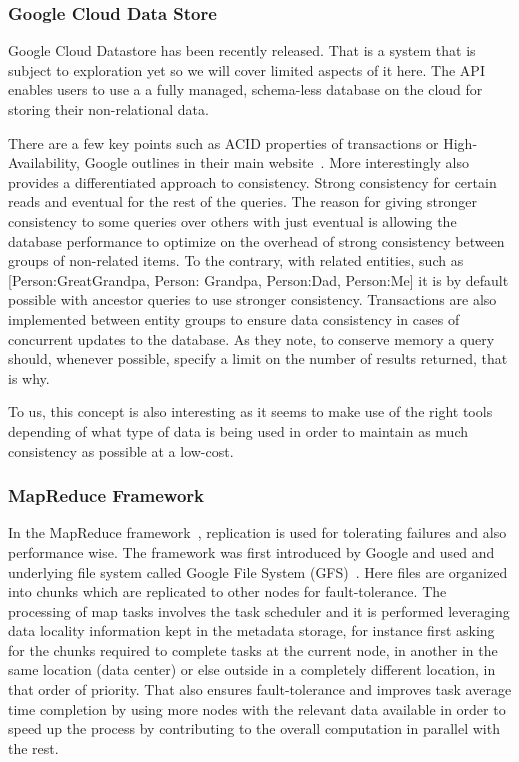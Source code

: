 \subsubsection{Google Cloud Data Store}
Google Cloud Datastore has been recently released. That is a system that is subject to exploration yet so we will cover limited aspects of it here. The API enables users to use a a fully managed, schema-less database on the cloud for storing their non-relational data.

There are a few key points such as ACID properties of transactions or High-Availability, Google outlines in their main website~\cite{GoogleCloudDataStore}. More interestingly also provides a differentiated approach to consistency. Strong consistency for certain reads and eventual for the rest of the queries. The reason for giving stronger consistency to some queries over others with just eventual is allowing the database performance to optimize on the overhead of strong consistency between groups of non-related items. To the contrary, with related entities, such as [Person:GreatGrandpa, Person: Grandpa, Person:Dad, Person:Me] it is by default possible with ancestor queries to use stronger consistency. Transactions are also implemented between entity groups to ensure data consistency in cases of concurrent updates to the database. As they note, to conserve memory a query should, whenever possible, specify a limit on the number of results returned, that is why.

To us, this concept is also interesting as it seems to make use of the right tools depending of what type of data is being used in order to maintain as much consistency as possible at a low-cost.

\subsubsection{MapReduce Framework}
In the MapReduce framework~\cite{Dean:04}, replication is used for tolerating failures and also performance wise. The framework was first introduced by Google and used and underlying file system called Google File System (GFS)~\cite{Ghemawat:03}. Here files are organized into chunks which are replicated to other nodes for fault-tolerance. The processing of map tasks involves the task scheduler and it is performed leveraging data locality information kept in the metadata storage, for instance first asking for the chunks required to complete tasks at the current node, in another in the same location (data center) or else outside in a completely different location, in that order of priority. That also ensures fault-tolerance and improves task average time completion by using more nodes with the relevant data available in order to speed up the process by contributing to the overall computation in parallel with the rest.



